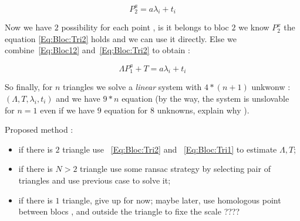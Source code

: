 \begin{equation}
	P^a_2    = a \lambda_i + t_i     \label{Eq:Bloc:Tri2}
\end{equation}

Now we have $2$  possibility for each point , is it belongs to bloc $2$ we know $P^x_2$ the equation
\ref{Eq:Bloc:Tri2} holds and we can use it directly. Else we combine~\ref{Eq:Bloc12} and~\ref{Eq:Bloc:Tri2}
to obtain  :

\begin{equation}
	 \Lambda P^a_1 + T = a \lambda_i + t_i \label{Eq:Bloc:Tri1}
\end{equation}

So finally, for  $n$ triangles we solve a \emph{linear} system with $4*(n+1)$ unkwonw  :
$(\Lambda,T,\lambda_i,t_i)$ and we have $9*n$ equation  (by the way, the system
is unslovable for $n=1$ even if we have $9$ equation for $8$ unknowns, explain why ).

Proposed method :

\begin{itemize}
    \item if there is $2$ triangle use ~\ref{Eq:Bloc:Tri2} and ~\ref{Eq:Bloc:Tri1}
          to estimate $\Lambda,T$;

    \item if there is $N>2$ triangle use some ransac strategy by selecting pair of triangles
          and use previous case to solve it;

     \item if there is $1$ triangle, give up for now;  maybe later, use homologous point between
	     blocs , and outside the triangle to fixe the scale ????

\end{itemize}







